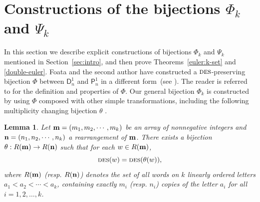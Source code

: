 \documentclass[12pt]{amsart} %
\numberwithin{equation}{section}
\theoremstyle{plain}
\newtheorem{lemma}[theorem]{Lemma}
\theoremstyle{definition}
\renewcommand\P{\mathsf{P}}
\newcommand\D{\mathsf{D}}
\def\DES{\hbox{\rm\textsc{des}}}
\begin{document}

%
\section{Constructions of the bijections \texorpdfstring{$\Phi_k$ and $\Psi_k$}{Phi-k and Psi-k}}\label{sec:desdez:sym}
\label{sec:3} %
In this section we describe explicit constructions of bijections $\Phi_k$ and $\Psi_k$ mentioned in Section~\ref{sec:intro}, and then prove Theorems~\ref{euler:k-set} and \ref{double-euler}.
Foata and the second author have constructed a $\DES$-preserving bijection $\Phi$ between $\D_n^1$ and $\P_n^1$ in a different form~(see \cite[Thm.~1.1]{fh1}). 
The reader is referred to \cite{fh1} for the definition and properties of $\Phi$. Our general bijection $\Phi_k$ is constructed by using $\Phi$ composed with other simple transformations, including the following multiplicity changing bijection $\theta$ 
\cite[Section 4]{han1992}. %
\begin{lemma}\label{lemma:mul0}
Let  
${\bf m}=(m_1, m_2, \cdots, m_k)$ be an array of nonnegative integers
and 
${\bf n}=(n_1, n_2, \cdots, n_k)$ a rearrangement of ${\bf m}$.
There exists a bijection 
	$\theta: R({\bf m}) \rightarrow R({\bf n})$ such that for each $w \in R({\bf m})$,
$$
	\DES(w) = \DES(\theta(w)),
	$$
	where $R({\bf m})$ (resp. $R({\bf n})$) denotes the set of all words on $k$ linearly ordered letters $a_1<a_2<\cdots<a_k$, containing exactly $m_i$ (resp. $n_i$) copies of the letter $a_i$ for all $i=1,2,\ldots, k$.
\end{lemma}
\end{document}
